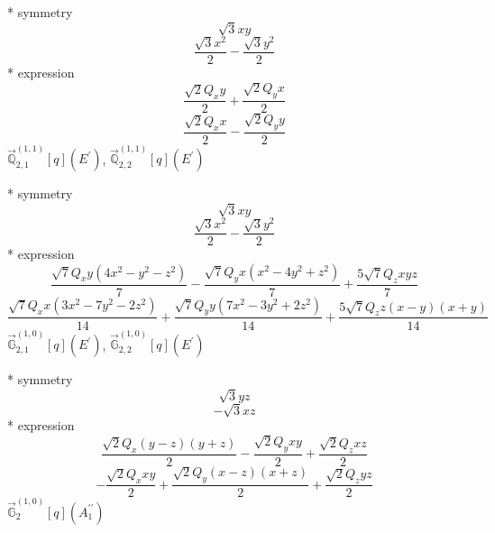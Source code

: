 \documentclass[fleqn,8pt]{jsarticle}
\begin{document}
\noindent\quad ** symmetry
\begin{dmath*}
\sqrt{3} x y
\end{dmath*}
\begin{dmath*}
\frac{\sqrt{3} x^{2}}{2} - \frac{\sqrt{3} y^{2}}{2}
\end{dmath*}
\noindent\quad ** expression
\begin{dmath*}
\frac{\sqrt{2} Q_{x} y}{2} + \frac{\sqrt{2} Q_{y} x}{2}
\end{dmath*}
\begin{dmath*}
\frac{\sqrt{2} Q_{x} x}{2} - \frac{\sqrt{2} Q_{y} y}{2}
\end{dmath*}
\noindent\quad $\vec{\mathbb{Q}}_{2,1}^{(1,1)}[q](E^{\prime})$, $\vec{\mathbb{Q}}_{2,2}^{(1,1)}[q](E^{\prime})$

\noindent\quad ** symmetry
\begin{dmath*}
\sqrt{3} x y
\end{dmath*}
\begin{dmath*}
\frac{\sqrt{3} x^{2}}{2} - \frac{\sqrt{3} y^{2}}{2}
\end{dmath*}
\noindent\quad ** expression
\begin{dmath*}
\frac{\sqrt{7} Q_{x} y \left(4 x^{2} - y^{2} - z^{2}\right)}{7} - \frac{\sqrt{7} Q_{y} x \left(x^{2} - 4 y^{2} + z^{2}\right)}{7} + \frac{5 \sqrt{7} Q_{z} x y z}{7}
\end{dmath*}
\begin{dmath*}
\frac{\sqrt{7} Q_{x} x \left(3 x^{2} - 7 y^{2} - 2 z^{2}\right)}{14} + \frac{\sqrt{7} Q_{y} y \left(7 x^{2} - 3 y^{2} + 2 z^{2}\right)}{14} + \frac{5 \sqrt{7} Q_{z} z \left(x - y\right) \left(x + y\right)}{14}
\end{dmath*}
\noindent\quad $\vec{\mathbb{G}}_{2,1}^{(1,0)}[q](E^{\prime})$, $\vec{\mathbb{G}}_{2,2}^{(1,0)}[q](E^{\prime})$

\noindent\quad ** symmetry
\begin{dmath*}
\sqrt{3} y z
\end{dmath*}
\begin{dmath*}
- \sqrt{3} x z
\end{dmath*}
\noindent\quad ** expression
\begin{dmath*}
\frac{\sqrt{2} Q_{x} \left(y - z\right) \left(y + z\right)}{2} - \frac{\sqrt{2} Q_{y} x y}{2} + \frac{\sqrt{2} Q_{z} x z}{2}
\end{dmath*}
\begin{dmath*}
- \frac{\sqrt{2} Q_{x} x y}{2} + \frac{\sqrt{2} Q_{y} \left(x - z\right) \left(x + z\right)}{2} + \frac{\sqrt{2} Q_{z} y z}{2}
\end{dmath*}
\noindent\quad $\vec{\mathbb{G}}_{2}^{(1,0)}[q](A_{1}^{\prime\prime})$
\end{document}

